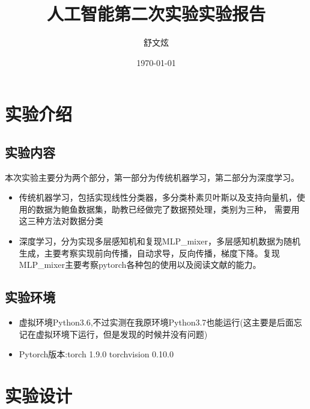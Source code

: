 \documentclass{report}
\title{人工智能第二次实验实验报告}
\author{舒文炫}
\date{\today}
\begin{document}
    \maketitle
    \tableofcontents
    \chapter{实验介绍}
    \section{实验内容}
    本次实验主要分为两个部分，第一部分为传统机器学习，第二部分为深度学习。
    \begin{itemize}
        \item 传统机器学习，包括实现线性分类器，多分类朴素贝叶斯以及支持向量机，使用的数据为鲍鱼数据集，助教已经做完了数据预处理，类别为三种，
        需要用这三种方法对数据分类
        \item 深度学习，分为实现多层感知机和复现MLP\_mixer，多层感知机数据为随机生成，主要考察实现前向传播，自动求导，反向传播，梯度下降。复现MLP\_mixer主要考察pytorch各种包的使用以及阅读文献的能力。
    \end{itemize}
    \section{实验环境}
    \begin{itemize}
        \item  虚拟环境Python3.6,不过实测在我原环境Python3.7也能运行(这主要是后面忘记在虚拟环境下运行，但是发现的时候并没有问题)
        \item  Pytorch版本:torch 1.9.0 torchvision 0.10.0
    \end{itemize}
    
    \chapter{实验设计}
\end{document}
